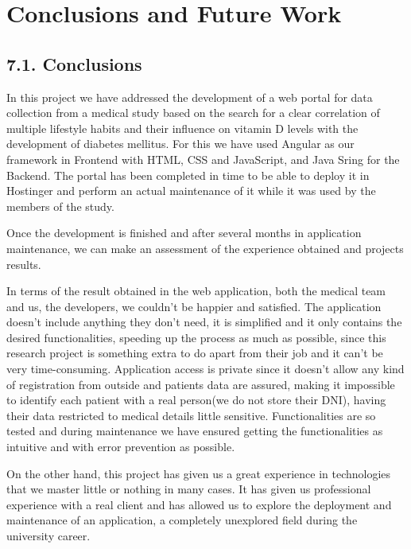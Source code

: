\chapter*{Conclusions and Future Work}

\section*{7.1. Conclusions}
    In this project we have addressed the development of a web portal for data collection from a medical study based on the search for a clear correlation of multiple lifestyle habits and their influence on vitamin D levels with the development of diabetes mellitus. For this we have used Angular as our framework in Frontend with HTML, CSS and JavaScript, and Java Sring for the Backend. The portal has been completed in time to be able to deploy it in Hostinger and perform an actual maintenance of it while it was used by the members of the study.\newline

    Once the development is finished and after several months in application maintenance, we can make an assessment of the experience obtained  and projects results. \newline

    In terms of the result obtained in the web application, both the medical team and us, the developers, we couldn't be happier and satisfied. The application doesn't include anything they don't need, it is simplified and it only contains the desired functionalities, speeding up the process as much as possible, since this research project is something extra to do apart from their job and it can't be very time-consuming. Application access is private since it doesn't allow any kind of registration from outside and patients data are assured, making it impossible to identify each patient with a real person(we do not store their DNI), having their data restricted  to medical details little sensitive. Functionalities are so tested and during maintenance we have ensured getting the functionalities as intuitive and with error prevention as possible. \newline
    
    On the other hand, this project has given us a great experience in technologies that we master little or nothing in many cases. It has given us professional experience with a real client and has allowed us to explore the deployment and maintenance of an application, a completely unexplored field during the university career. \newline
   
